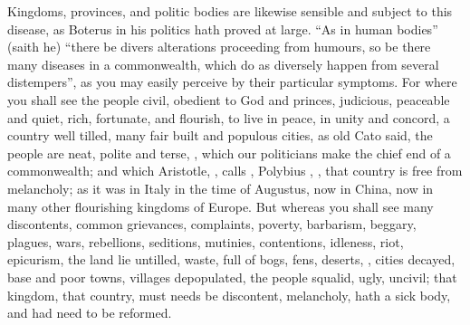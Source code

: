 Kingdoms, provinces, and politic bodies are likewise sensible and subject to
this disease, as Boterus in his politics hath proved at
large. \enquote{As in human bodies} (saith he) \enquote{there be divers alterations proceeding
from humours, so be there many diseases in a commonwealth, which do as
diversely happen from several distempers}, as you may easily perceive by their
particular symptoms. For where you shall see the people civil, obedient to God
and princes, judicious, peaceable and quiet, rich, fortunate,
and flourish, to live in peace, in unity and concord, a
country well tilled, many fair built and populous cities,  as old Cato said, the people are neat, polite and
terse, , which our politicians make the chief end
of a commonwealth; and which Aristotle,
, calls ,
Polybius , , that
country is free from melancholy; as it was in Italy in the time of Augustus,
now in China, now in many other flourishing kingdoms of Europe. But whereas you
shall see many discontents, common grievances, complaints, poverty, barbarism,
beggary, plagues, wars, rebellions, seditions, mutinies, contentions, idleness,
riot, epicurism, the land lie untilled, waste, full of bogs, fens, deserts,
\etc{}, cities decayed, base and poor towns, villages depopulated, the people
squalid, ugly, uncivil; that kingdom, that country, must needs be discontent,
melancholy, hath a sick body, and had need to be reformed.

